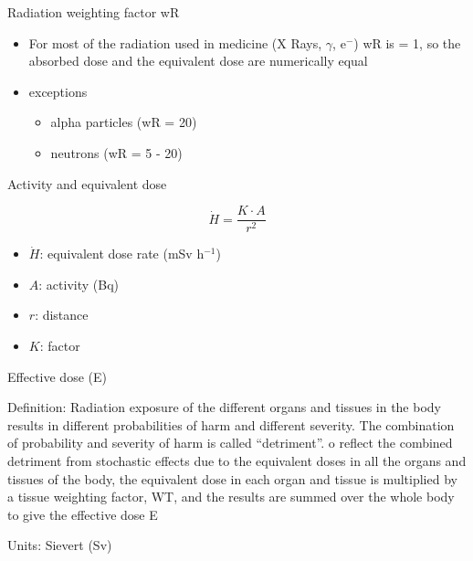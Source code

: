 \begin{frame}{Radiation weighting factor wR}

\begin{exampleblock}{}

\begin{itemize}
\item For most of the radiation used in medicine (X Rays, $\gamma$, e$^{-}$) wR is = 1, so the absorbed dose and the equivalent dose are numerically equal
\item exceptions

\begin{itemize}
\item alpha particles (wR = 20) 
\item neutrons (wR = 5 - 20)
\end{itemize}

\end{itemize}

\end{exampleblock}

\end{frame}

\begin{frame}{Activity and equivalent dose}

\begin{block}{}
\[\dot{H}=\frac{K\cdot A}{r^2}\]
\end{block}

\begin{block}{}
\begin{itemize}
\item $\dot{H}$: equivalent dose rate (mSv h$^{-1}$)
\item $A$: activity (Bq)
\item $r$: distance
\item $K$: factor 
\end{itemize}
\end{block}

\end{frame}

\begin{frame}{Effective dose (E)}

\alert{Definition}: Radiation exposure of the different organs and tissues in the body results in different probabilities of harm and different severity. The combination of probability and severity of harm is called ``detriment''. o reflect the combined detriment from stochastic effects due to the equivalent doses in all the organs and tissues of the body, the equivalent dose in each organ and tissue is multiplied by a tissue weighting factor, WT, and the results are summed over the whole body to give the effective dose E

\alert{Units}: Sievert (Sv)

\end{frame}

